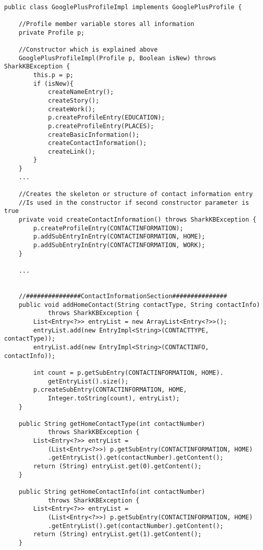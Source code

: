 \documentclass[12pt]{article}
\begin{document}
\begin{verbatim}

public class GooglePlusProfileImpl implements GooglePlusProfile {

    //Profile member variable stores all information
    private Profile p;

    //Constructor which is explained above 
    GooglePlusProfileImpl(Profile p, Boolean isNew) throws SharkKBException {
        this.p = p;
        if (isNew){
            createNameEntry();
            createStory();
            createWork();
            p.createProfileEntry(EDUCATION);
            p.createProfileEntry(PLACES);
            createBasicInformation();
            createContactInformation();
            createLink();
        }
    }
    ...

    //Creates the skeleton or structure of contact information entry
    //Is used in the constructor if second constructor parameter is true
    private void createContactInformation() throws SharkKBException {
        p.createProfileEntry(CONTACTINFORMATION);
        p.addSubEntryInEntry(CONTACTINFORMATION, HOME);
        p.addSubEntryInEntry(CONTACTINFORMATION, WORK);
    }

    ...


    //###############ContactInformationSection###############
    public void addHomeContact(String contactType, String contactInfo)
            throws SharkKBException {
        List<Entry<?>> entryList = new ArrayList<Entry<?>>();
        entryList.add(new EntryImpl<String>(CONTACTTYPE, contactType));
        entryList.add(new EntryImpl<String>(CONTACTINFO, contactInfo));

        int count = p.getSubEntry(CONTACTINFORMATION, HOME).
            getEntryList().size();
        p.createSubEntry(CONTACTINFORMATION, HOME,
            Integer.toString(count), entryList);
    }

    public String getHomeContactType(int contactNumber) 
            throws SharkKBException {
        List<Entry<?>> entryList = 
            (List<Entry<?>>) p.getSubEntry(CONTACTINFORMATION, HOME)
            .getEntryList().get(contactNumber).getContent();
        return (String) entryList.get(0).getContent();
    }

    public String getHomeContactInfo(int contactNumber) 
            throws SharkKBException {
        List<Entry<?>> entryList = 
            (List<Entry<?>>) p.getSubEntry(CONTACTINFORMATION, HOME)
            .getEntryList().get(contactNumber).getContent();
        return (String) entryList.get(1).getContent();
    }


\end{verbatim}
\end{document}

